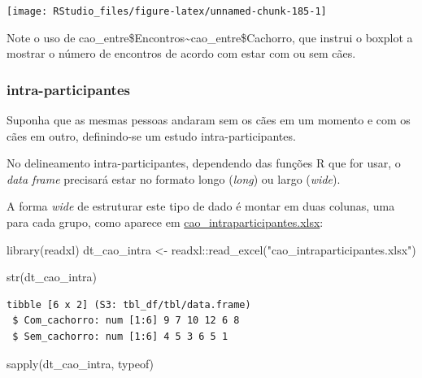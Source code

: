 \documentclass[
]{article}
\newenvironment{Shaded}{\begin{snugshade}}{\end{snugshade}}
\newcommand{\FunctionTok}[1]{\textcolor[rgb]{0.00,0.00,0.00}{#1}}
\newcommand{\NormalTok}[1]{#1}
\newcommand{\OtherTok}[1]{\textcolor[rgb]{0.56,0.35,0.01}{#1}}
\newcommand{\SpecialCharTok}[1]{\textcolor[rgb]{0.00,0.00,0.00}{#1}}
\newcommand{\StringTok}[1]{\textcolor[rgb]{0.31,0.60,0.02}{#1}}
\begin{document}
\begin{center}\texttt{[image: RStudio\_files/figure-latex/unnamed-chunk-185-1]} \end{center}

Note o uso de cao\_entre\$Encontros\textasciitilde cao\_entre\$Cachorro,
que instrui o boxplot a mostrar o número de encontros de acordo com
estar com ou sem cães.

\hypertarget{intra-participantes}{%
\subsubsection{intra-participantes}\label{intra-participantes}}

Suponha que as mesmas pessoas andaram sem os cães em um momento e com os
cães em outro, definindo-se um estudo intra-participantes.

No delineamento intra-participantes, dependendo das funções R que for
usar, o \emph{data frame} precisará estar no formato longo (\emph{long})
ou largo (\emph{wide}).

A forma \emph{wide} de estruturar este tipo de dado é montar em duas
colunas, uma para cada grupo, como aparece em
\url{cao_intraparticipantes.xlsx}:

\begin{Shaded}
\begin{Highlighting}[]
\FunctionTok{library}\NormalTok{(readxl)}
\NormalTok{dt\_cao\_intra }\OtherTok{\textless{}{-}}\NormalTok{ readxl}\SpecialCharTok{::}\FunctionTok{read\_excel}\NormalTok{(}\StringTok{"cao\_intraparticipantes.xlsx"}\NormalTok{)}
\end{Highlighting}
\end{Shaded}

\begin{Shaded}
\begin{Highlighting}[]
\FunctionTok{str}\NormalTok{(dt\_cao\_intra)}
\end{Highlighting}
\end{Shaded}

\begin{verbatim}
tibble [6 x 2] (S3: tbl_df/tbl/data.frame)
 $ Com_cachorro: num [1:6] 9 7 10 12 6 8
 $ Sem_cachorro: num [1:6] 4 5 3 6 5 1
\end{verbatim}

\begin{Shaded}
\begin{Highlighting}[]
\FunctionTok{sapply}\NormalTok{(dt\_cao\_intra, typeof)}
\end{Highlighting}
\end{Shaded}
\end{document}
